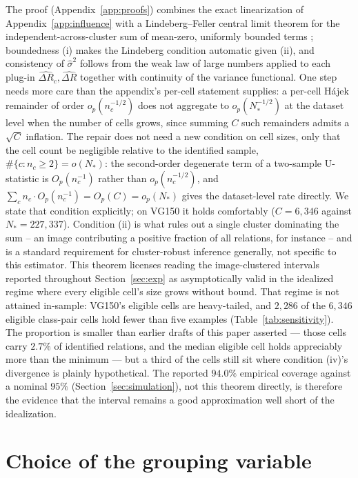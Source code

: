 The proof (Appendix~\ref{app:proofs}) combines the exact linearization of
Appendix~\ref{app:influence} with a Lindeberg--Feller central limit theorem for the
independent-across-cluster sum of mean-zero, uniformly bounded terms
\citep{serfling1980approximation,vandervaart1998asymptotic}; boundedness (i) makes the
Lindeberg condition automatic given (ii), and consistency of $\widehat\sigma^2$ follows
from the weak law of large numbers applied to each plug-in $\widehat{\Delta R}_c,
\widehat{\Delta R}$ together with continuity of the variance functional. One step needs
more care than the appendix's per-cell statement supplies: a per-cell H\'ajek remainder of
order $o_p(n_c^{-1/2})$ does not aggregate to $o_p(N_*^{-1/2})$ at the dataset level when
the number of cells grows, since summing $C$ such remainders admits a $\sqrt C$ inflation.
The repair does not need a new condition on cell sizes, only that the cell count be
negligible relative to the identified sample, $\#\{c:n_c\ge2\}=o(N_*)$: the second-order
degenerate term of a two-sample U-statistic is $O_p(n_c^{-1})$ rather than
$o_p(n_c^{-1/2})$, and $\sum_c n_c\cdot O_p(n_c^{-1})=O_p(C)=o_p(N_*)$ gives the
dataset-level rate directly. We state that condition explicitly; on VG150 it holds
comfortably ($C=6{,}346$ against $N_*=227{,}337$). Condition (ii) is what rules out a single cluster dominating the
sum -- an image contributing a positive fraction of all relations, for instance -- and
is a standard requirement for cluster-robust inference generally, not specific to this
estimator. This theorem licenses reading the image-clustered intervals reported
throughout Section~\ref{sec:exp} as asymptotically valid in the idealized regime where
every eligible cell's size grows without bound. That regime is not attained in-sample:
VG150's eligible cells are heavy-tailed, and $2{,}286$ of the $6{,}346$ eligible
class-pair cells hold fewer than five examples (Table~\ref{tab:sensitivity}). The
proportion is smaller than earlier drafts of this paper asserted --- those cells carry
$2.7\%$ of identified relations, and the median eligible cell holds appreciably more than
the minimum --- but a third of the cells still sit where condition (iv)'s divergence is
plainly hypothetical. The reported $94.0\%$ empirical coverage against a nominal $95\%$
(Section~\ref{sec:simulation}), not this theorem directly, is therefore the evidence that
the interval remains a good approximation well short of the idealization.

\section{Choice of the grouping variable}\label{app:partition}

